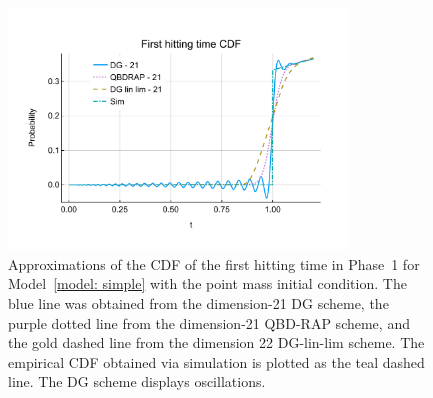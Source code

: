 \begin{figure}[h]
	\centering
	\includegraphics[width=0.8\textwidth,trim={0cm 1.25cm 0cm 1.25cm},clip]{chapter6/figs/hitting_times_model/hitting_times/point_mass/cdf_order21DG_and_sims.pdf}%
	\caption{Approximations of the CDF of the first hitting time in Phase~1 for Model~\ref{model: simple} with the point mass initial condition. The blue line was obtained from the dimension-21 DG scheme, the purple dotted line from the dimension-21 QBD-RAP scheme, and the gold dashed line from the dimension 22 DG-lin-lim scheme. The empirical CDF obtained via simulation is plotted as the teal dashed line. The DG scheme displays oscillations. } 
	\label{fig: hitting time oscillation} 
\end{figure}

\FloatBarrier
